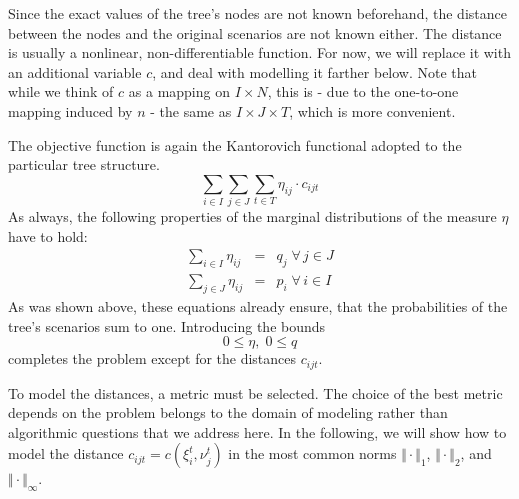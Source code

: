 \documentclass[a4paper, 12pt] {article}
\begin{document}
Since the exact values of the tree's nodes are not known beforehand, the distance between the nodes and the original scenarios are not known either. The distance is usually a nonlinear, non-differentiable function. For now, we will replace it with an additional variable $c$, and deal with modelling it farther below. Note that while we think of $c$ as a mapping on $I\times N$, this is - due to the one-to-one mapping induced by $n$ - the same as $I\times J\times T$, which is more convenient.

The objective function is again the Kantorovich functional adopted to the particular tree structure.
\begin{equation}
  \label{eq:NLP-derivation-objective}
  \sum_{i\in I}\sum_{j\in J}\sum_{t\in T} \eta_{ij}\cdot c_{ijt}
\end{equation}
As always, the following properties of the marginal distributions of the measure $\eta$ have to hold:
\begin{eqnarray}
  \label{eq:eta-nlp-marginal-q}
  \sum_{i\in I}\eta_{ij} &=& q_j \;\forall\, j\in J\\
  \label{eq:eta-nlp-marginal-p}
  \sum_{j\in J}\eta_{ij} &=& p_i \;\forall\, i\in I
\end{eqnarray}
As was shown above, these equations already ensure, that the probabilities of the tree's scenarios sum to one. Introducing the bounds
\begin{equation}
  \label{eq:bounds-nlp-q-eta}
  0 \leq \eta,\; 0\leq q
\end{equation}
completes the problem except for the distances $c_{ijt}$.

To model the distances, a metric must be selected. The choice of the best metric depends on the problem belongs to the domain of modeling rather than algorithmic questions that we address here. In the following, we will show how to model the distance $c_{ijt}=c(\xi_i^t,\nu_j^t)$ in the most common norms $\Vert\cdot\Vert_1$, $\Vert\cdot\Vert_2$, and $\Vert\cdot\Vert_\infty$.
% 
\end{document}
